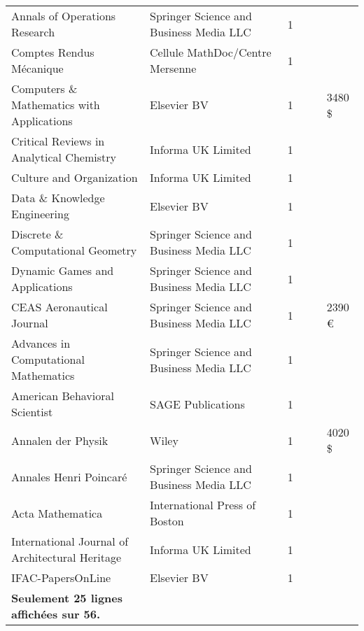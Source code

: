 \begin{longtable}{p{.27\linewidth}P{.18\linewidth}P{.07\linewidth}P{.12\linewidth}P{.12\linewidth}P{.07\linewidth}}
Annals of Operations Research & Springer Science and Business Media LLC & 1 &  &  &  \\
Comptes Rendus Mécanique & Cellule MathDoc/Centre Mersenne & 1 &  &  &  \\
Computers \& Mathematics with Applications & Elsevier BV & 1 &  &  & 3480 \$ \\
Critical Reviews in Analytical Chemistry & Informa UK Limited & 1 &  &  &  \\
Culture and Organization & Informa UK Limited & 1 &  &  &  \\
Data \& Knowledge Engineering & Elsevier BV & 1 &  &  &  \\
Discrete \& Computational Geometry & Springer Science and Business Media LLC & 1 &  &  &  \\
Dynamic Games and Applications & Springer Science and Business Media LLC & 1 &  &  &  \\
CEAS Aeronautical Journal & Springer Science and Business Media LLC & 1 &  &  & 2390 € \\
Advances in Computational Mathematics & Springer Science and Business Media LLC & 1 &  &  &  \\
American Behavioral Scientist & SAGE Publications & 1 &  &  &  \\
Annalen der Physik & Wiley & 1 &  &  & 4020 \$ \\
Annales Henri Poincaré & Springer Science and Business Media LLC & 1 &  &  &  \\
Acta Mathematica & International Press of Boston & 1 &  &  &  \\
International Journal of Architectural Heritage & Informa UK Limited & 1 &  &  &  \\
IFAC-PapersOnLine & Elsevier BV & 1 &  &  &  \\
\textbf{Seulement 25 lignes affichées sur 56.} \\
\bottomrule
\end{longtable}
